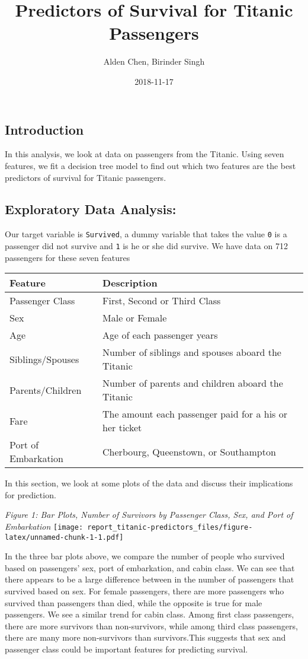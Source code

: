 \documentclass[]{article}
\title{Predictors of Survival for Titanic Passengers}
\author{Alden Chen, Birinder Singh}
\date{2018-11-17}
\begin{document}
\maketitle

\subsection{Introduction}\label{introduction}

In this analysis, we look at data on passengers from the Titanic. Using
seven features, we fit a decision tree model to find out which two
features are the best predictors of survival for Titanic passengers.

\subsection{Exploratory Data Analysis:}\label{exploratory-data-analysis}

Our target variable is \texttt{Survived}, a dummy variable that takes
the value \texttt{0} is a passenger did not survive and \texttt{1} is he
or she did survive. We have data on 712 passengers for these seven
features

\begin{longtable}[]{@{}ll@{}}
\toprule
Feature & Description\tabularnewline
\midrule
\endhead
Passenger Class & First, Second or Third Class\tabularnewline
Sex & Male or Female\tabularnewline
Age & Age of each passenger years\tabularnewline
Siblings/Spouses & Number of siblings and spouses aboard the
Titanic\tabularnewline
Parents/Children & Number of parents and children aboard the
Titanic\tabularnewline
Fare & The amount each passenger paid for a his or her
ticket\tabularnewline
Port of Embarkation & Cherbourg, Queenstown, or
Southampton\tabularnewline
\bottomrule
\end{longtable}

In this section, we look at some plots of the data and discuss their
implications for prediction.

\emph{Figure 1: Bar Plots, Number of Survivors by Passenger Class, Sex,
and Port of Embarkation}
\texttt{[image: report\_titanic-predictors\_files/figure-latex/unnamed-chunk-1-1.pdf]}

In the three bar plots above, we compare the number of people who
survived based on passengers' sex, port of embarkation, and cabin class.
We can see that there appears to be a large difference between in the
number of passengers that survived based on sex. For female passengers,
there are more passengers who survived than passengers than died, while
the opposite is true for male passengers. We see a similar trend for
cabin class. Among first class passengers, there are more survivors than
non-survivors, while among third class passengers, there are many more
non-survivors than survivors.This suggests that sex and passenger class
could be important features for predicting survival.
\end{document}
